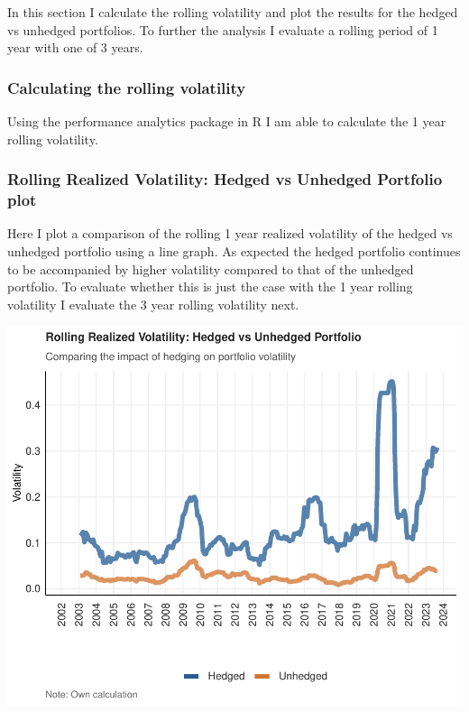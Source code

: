 \documentclass[11pt,preprint, authoryear]{elsarticle}
\numberwithin{equation}{section}
\numberwithin{figure}{section}
\numberwithin{table}{section}
\begin{document}
In this section I calculate the rolling volatility and plot the results
for the hedged vs unhedged portfolios. To further the analysis I
evaluate a rolling period of 1 year with one of 3 years.

\hypertarget{calculating-the-rolling-volatility}{%
\subsubsection{Calculating the rolling
volatility}\label{calculating-the-rolling-volatility}}

Using the performance analytics package in R I am able to calculate the
1 year rolling volatility.

\hypertarget{rolling-realized-volatility-hedged-vs-unhedged-portfolio-plot}{%
\subsubsection{Rolling Realized Volatility: Hedged vs Unhedged Portfolio
plot}\label{rolling-realized-volatility-hedged-vs-unhedged-portfolio-plot}}

Here I plot a comparison of the rolling 1 year realized volatility of
the hedged vs unhedged portfolio using a line graph. As expected the
hedged portfolio continues to be accompanied by higher volatility
compared to that of the unhedged portfolio. To evaluate whether this is
just the case with the 1 year rolling volatility I evaluate the 3 year
rolling volatility next.

\includegraphics{Question-2_files/figure-latex/unnamed-chunk-6-1.pdf}
\end{document}
